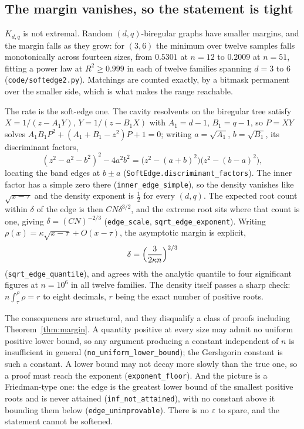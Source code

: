 \documentclass[11pt]{article}
\theoremstyle{remark}
\begin{document}
\subsection{The margin vanishes, so the statement is tight}\label{sec:softedge}

$K_{d,q}$ is not extremal. Random $(d,q)$-biregular graphs have smaller margins, and the margin
falls as they grow: for $(3,6)$ the minimum over twelve samples falls monotonically across
fourteen sizes, from $0.5301$ at $n=12$ to $0.2009$ at $n=51$, fitting a power law at
$R^2\ge0.999$ in each of twelve families spanning $d=3$ to $6$ (\texttt{code/softedge2.py}).
Matchings are counted exactly, by a bitmask permanent over the smaller side, which is what makes
the range reachable.

The rate is the soft-edge one. The cavity resolvents on the biregular tree satisfy
$X=1/(z-A_1Y)$, $Y=1/(z-B_1X)$ with $A_1=d-1$, $B_1=q-1$, so $P=XY$ solves
$A_1B_1P^2+(A_1+B_1-z^2)P+1=0$; writing $a=\sqrt{A_1}$, $b=\sqrt{B_1}$, its discriminant factors,
\begin{equation}\label{eq:disc}
   (z^2-a^2-b^2)^2-4a^2b^2=\bigl(z^2-(a+b)^2\bigr)\bigl(z^2-(b-a)^2\bigr),
\end{equation}
locating the band edges at $b\pm a$ (\texttt{SoftEdge.discriminant\_factors}). The inner factor
has a simple zero there (\texttt{inner\_edge\_simple}), so the density vanishes like
$\sqrt{x-\tau}$ and the density exponent is $\tfrac12$ for every $(d,q)$. The expected root count
within $\delta$ of the edge is then $CN\delta^{3/2}$, and the extreme root sits where that count
is one, giving $\delta=(CN)^{-2/3}$ (\texttt{edge\_scale}, \texttt{sqrt\_edge\_exponent}).
Writing $\rho(x)=\kappa\sqrt{x-\tau}+O(x-\tau)$, the asymptotic margin is explicit,
\begin{equation}\label{eq:constant}
   \delta=\Bigl(\frac{3}{2\kappa n}\Bigr)^{2/3}
\end{equation}
(\texttt{sqrt\_edge\_quantile}), and agrees with the analytic quantile to four significant
figures at $n=10^6$ in all twelve families. The density itself passes a sharp check:
$n\int_\tau^\rho\rho=r$ to eight decimals, $r$ being the exact number of positive roots.

The consequences are structural, and they disqualify a class of proofs including
Theorem~\ref{thm:margin}. A quantity positive at every size may admit no uniform positive lower
bound, so any argument producing a constant independent of $n$ is insufficient in general
(\texttt{no\_uniform\_lower\_bound}); the Gershgorin constant is such a constant. A lower bound
may not decay more slowly than the true one, so a proof must reach the exponent
(\texttt{exponent\_floor}). And the picture is a Friedman-type one: the edge is the greatest lower
bound of the smallest positive roots and is never attained (\texttt{inf\_not\_attained}), with no
constant above it bounding them below (\texttt{edge\_unimprovable}). There is no $\varepsilon$ to
spare, and the statement cannot be softened.
\end{document}
